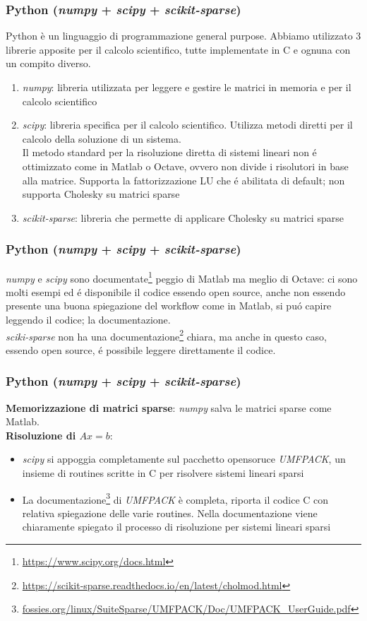 \documentclass{beamer}
\begin{document}
\begin{frame}
\frametitle{Python (\textit{numpy} + \textit{scipy} + \textit{scikit-sparse})}
Python è un linguaggio di programmazione general purpose. Abbiamo utilizzato 3 librerie apposite per il calcolo scientifico, tutte implementate in C e ognuna con un compito diverso.
\begin{enumerate}
\item \textit{numpy}: libreria utilizzata per leggere e gestire le matrici in memoria e per il calcolo scientifico
\item \textit{scipy}: libreria specifica per il calcolo scientifico. Utilizza metodi diretti per il calcolo della soluzione di un sistema.\\
Il metodo standard per la risoluzione diretta di sistemi lineari non \'e ottimizzato come in Matlab o Octave, ovvero non divide i risolutori in base alla matrice. Supporta la fattorizzazione LU che \'e abilitata di default; non supporta Cholesky su matrici sparse
\item \textit{scikit-sparse}: libreria che permette di applicare Cholesky su matrici sparse
\end{enumerate}
\end{frame}
\begin{frame}
\frametitle{Python (\textit{numpy} + \textit{scipy} + \textit{scikit-sparse})}
\textit{numpy} e \textit{scipy} sono documentate\footnote{\url{https://www.scipy.org/docs.html}} peggio di Matlab ma meglio di Octave: ci sono molti esempi ed \'e disponibile il codice essendo open source, anche non essendo presente una buona spiegazione del workflow come in Matlab, si pu\'o capire leggendo il codice; la documentazione.\\ \textit{sciki-sparse} non ha una documentazione\footnote{\url{https://scikit-sparse.readthedocs.io/en/latest/cholmod.html}} chiara, ma anche in questo caso, essendo open source, \'e possibile leggere direttamente il codice.
\end{frame}

\begin{frame}
	\frametitle{Python (\textit{numpy} + \textit{scipy} + \textit{scikit-sparse})}
	\textbf{Memorizzazione di matrici sparse}: \textit{numpy} salva le matrici sparse come Matlab.\\
	\textbf{Risoluzione di $Ax = b$}:
	\begin{itemize}
		\item \textit{scipy} si appoggia completamente sul pacchetto opensoruce \textit{UMFPACK}, un insieme di routines scritte in C per risolvere sistemi lineari sparsi

		\item La documentazione\footnote{\url{fossies.org/linux/SuiteSparse/UMFPACK/Doc/UMFPACK_UserGuide.pdf}} di \textit{UMFPACK} è completa, riporta il codice C con relativa spiegazione delle varie routines. Nella documentazione viene chiaramente spiegato il processo di risoluzione per sistemi lineari sparsi

	\end{itemize}
\end{frame}
\end{document}
